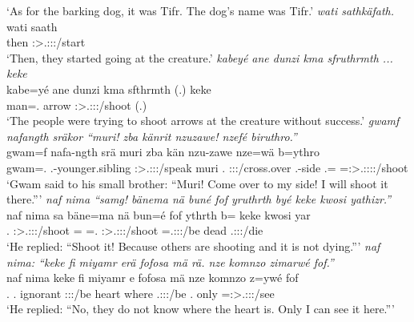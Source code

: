 \begin{exe}
	\trans `As for the barking dog, it was Tifr. The dog's name was Tifr.'
	\emph{wati sathkäfath.}\\
	\gll wati saath\\ 
	then \Stpl:\Sbj>\Tsg.\Masc:\Obj:\Pst:\Ipfv/start\\
	\trans `Then, they started going at the creature.'
	\emph{kabeyé ane dunzi kma sfruthrmth ... keke}\\
	\gll kabe=yé ane dunzi kma sfthrmth (.) keke\\ 
	man=\Erg.\Nsg{} \Dem{} arrow \Pot{} \Stpl:\Sbj>\Tsg.\Masc:\Obj:\Pst:\Dur/shoot (.) \Neg\\
	\trans `The people were trying to shoot arrows at the creature without success.'
	\emph{gwamf nafangth sräkor ``muri! zba känrit nzuzawe! nzefé biruthro.''}\\
	\gll gwam=f nafa-ngth srä muri zba kän nzu-zawe nze=wä b=ythro\\ 
	gwam=\Erg.\Sg{} \Third.\Poss-younger.sibling \Stsg:\Sbj>\Tsg.\Masc:\Obj:\Irr:\Pfv/speak muri \Prox.\Abl{} \Ssg:\Sbj:\Imp:\Pfv/cross.over \Fsg.\Poss-side \Fsg.\Erg=\Emph{} \Med=\Sg:\Sbj>\Tsg.\Masc:\Obj:\Nonpast:\Ipfv:\Andat/shoot\\
	\trans `Gwam said to his small brother: ``Muri! Come over to my side! I will shoot it there.'''
	\emph{naf nima ``samg! bänema nä buné fof yruthrth byé keke kwosi yathizr.''}\\
	\gll naf nima sa bäne=ma {nä bun=é} fof ythrth b= keke kwosi yar\\ 
	\Tsg.\Erg{} \Quot{} \Ssg:\Sbj>\Tsg.\Masc:\Obj:\Imp:\Pfv/shoot \Recog=\Char{} \Indf=\Erg.\Nsg{} \Emph{} \Stpl:\Sbj>\Tsg.\Masc:\Obj:\Nonpast:\Ipfv/shoot \Med=\Tsg.\Masc:\Sbj:\Nonpast:\Ipfv/be \Neg{} dead \Tsg.\Masc:\Sbj:\Nonpast:\Ipfv/die\\
	\trans `He replied: ``Shoot it! Because others are shooting and it is not dying.'''
	\emph{naf nima: ``keke fi miyamr erä fofosa mä rä. nze komnzo zimarwé fof.''}\\
	\gll naf nima keke fi miyamr e fofosa mä  nze komnzo z=ywé fof\\ 
	\Tsg.\Erg{} \Quot{} \Neg{} \Third.\Abs{} ignorant \Stpl:\Sbj:\Nonpast:\Ipfv/be heart where \Tsg.\F:\Sbj:\Nonpast:\Ipfv/be \Fsg.\Erg{} only \Prox=\Fsg:\Sbj>\Tsg.\Masc:\Obj:\Nonpast:\Ipfv/see \Emph{}\\
	\trans `He replied: ``No, they do not know where the heart is. Only I can see it here.'''

\end{exe}
